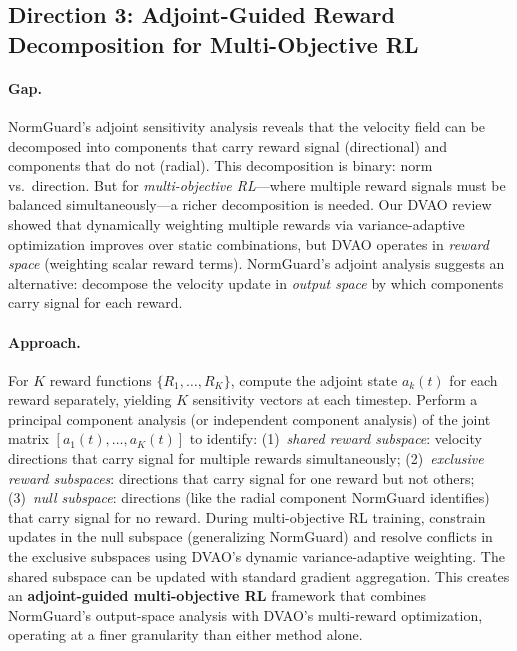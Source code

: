 \documentclass[11pt,a4paper]{article}
\begin{document}
\subsection{Direction 3: Adjoint-Guided Reward Decomposition for Multi-Objective RL}

\paragraph{Gap.} NormGuard's adjoint sensitivity analysis reveals that the velocity field can be decomposed into components that carry reward signal (directional) and components that do not (radial). This decomposition is binary: norm vs.\ direction. But for \emph{multi-objective RL}---where multiple reward signals must be balanced simultaneously---a richer decomposition is needed. Our DVAO review~\cite{chen2026dvao} showed that dynamically weighting multiple rewards via variance-adaptive optimization improves over static combinations, but DVAO operates in \emph{reward space} (weighting scalar reward terms). NormGuard's adjoint analysis suggests an alternative: decompose the velocity update in \emph{output space} by which components carry signal for each reward.

\paragraph{Approach.} For $K$ reward functions $\{R_1, \ldots, R_K\}$, compute the adjoint state $a_k(t)$ for each reward separately, yielding $K$ sensitivity vectors at each timestep. Perform a principal component analysis (or independent component analysis) of the joint matrix $[a_1(t), \ldots, a_K(t)]$ to identify: (1)~\emph{shared reward subspace}: velocity directions that carry signal for multiple rewards simultaneously; (2)~\emph{exclusive reward subspaces}: directions that carry signal for one reward but not others; (3)~\emph{null subspace}: directions (like the radial component NormGuard identifies) that carry signal for no reward. During multi-objective RL training, constrain updates in the null subspace (generalizing NormGuard) and resolve conflicts in the exclusive subspaces using DVAO's dynamic variance-adaptive weighting. The shared subspace can be updated with standard gradient aggregation. This creates an \textbf{adjoint-guided multi-objective RL} framework that combines NormGuard's output-space analysis with DVAO's multi-reward optimization, operating at a finer granularity than either method alone.
\end{document}
